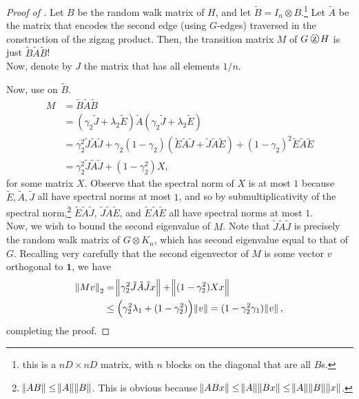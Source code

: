			\begin{proof}[Proof of ]
				Let $B$ be the random walk matrix of $H$, and let $\tilde{B} = I_n \otimes B$.\footnote{this is a $nD \times nD$ matrix, with $n$ blocks on the diagonal that are all $B$s.} Let $\tilde{A}$ be the matrix that encodes the second edge (using $G$-edges) traversed in the construction of the zigzag product. Then, the transition matrix $M$ of $G \zigzag H$ is just $\tilde{B} \tilde{A} \tilde{B}$!\\
				Now, denote by $J$ the matrix that has all elements $1/n$. 

				Now, use  on $\tilde{B}$.
				\begin{align*}
					M &= \tilde{B} \tilde{A} \tilde{B} \\
						&= \left( \gamma_2 \tilde{J} + \lambda_2 \tilde{E} \right) \tilde{A} \left( \gamma_2 \tilde{J} + \lambda_2 \tilde{E} \right) \\
						&= \gamma_2^2 \tilde{J} \tilde{A} \tilde{J} + \gamma_2(1-\gamma_2) \left( \tilde{E}\tilde{A}\tilde{J} + \tilde{J}\tilde{A}\tilde{E} \right) + (1-\gamma_2)^2 \tilde{E}\tilde{A}\tilde{E} \\
						&= \gamma_2^2 \tilde{J} \tilde{A} \tilde{J} + (1-\gamma_2^2) X,
				\end{align*}
				for some matrix $X$. Observe that the spectral norm of $X$ is at most $1$ because $\tilde{E},\tilde{A},\tilde{J}$ all have spectral norms at most $1$, and so by submultiplicativity of the spectral norm,\footnote{$\norm{AB} \le \norm{A}\norm{B}$. This is obvious because $\norm{ABx} \le \norm{A}\norm{Bx} \le \norm{A}\norm{B}\norm{x}$.} $\tilde{E}\tilde{A}\tilde{J}$, $\tilde{J}\tilde{A}\tilde{E}$, and $\tilde{E}\tilde{A}\tilde{E}$ all have spectral norms at most $1$.\\
				Now, we wish to bound the second eigenvalue of $M$. Note that $\tilde{J}\tilde{A}\tilde{J}$ is precisely the random walk matrix of $G \otimes K_n$, which has second eigenvalue equal to that of $G$. Recalling very carefully that the second eigenvector of $M$ is some vector $v$ orthogonal to $\textbf{1}$, we have
				\begin{align*}
					\norm{Mv}_2 &= \norm{\gamma_2^2 \tilde{J} \tilde{A} \tilde{J} x} + \norm{(1-\gamma_2^2)X x} \\
						&\le \left(\gamma_2^2 \lambda_1 + (1-\gamma_2^2)\right) \norm{v} = (1-\gamma_2^2\gamma_1) \norm{v},
				\end{align*}
				completing the proof.
			\end{proof}
			
